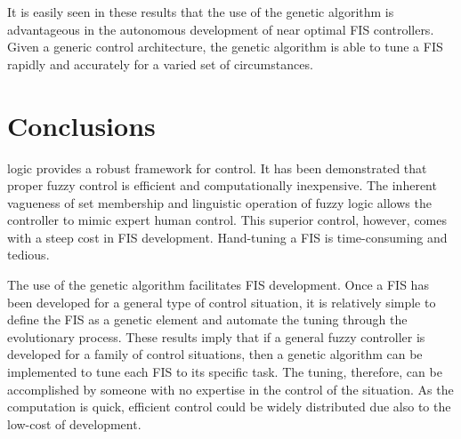 \documentclass[submit]{aiaa-tc}%
\begin{document}
It is easily seen in these results that the use of the genetic algorithm is advantageous in the autonomous development of near optimal FIS controllers. Given a generic control architecture, the genetic algorithm is able to tune a FIS rapidly and accurately for a varied set of circumstances.

\section{Conclusions}
 logic provides a robust framework for control. It has been demonstrated that proper fuzzy control is efficient and computationally inexpensive. The inherent vagueness of set membership and linguistic operation of fuzzy logic allows the controller to mimic expert human control. This superior control, however, comes with a steep cost in FIS development. Hand-tuning a FIS is time-consuming and tedious.


The use of the genetic algorithm facilitates FIS development. Once a FIS has been developed for a general type of control situation, it is relatively simple to define the FIS as a genetic element and automate the tuning through the evolutionary process. These results imply that if a general fuzzy controller is developed for a family of control situations, then a genetic algorithm can be implemented to tune each FIS to its specific task. The tuning, therefore, can be accomplished by someone with no expertise in the control of the situation. As the computation is quick, efficient control could be widely distributed due also to the low-cost of development.



\end{document}
